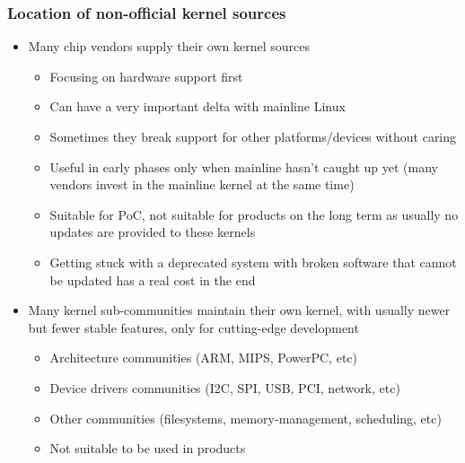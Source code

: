 \begin{frame}
  \frametitle{Location of non-official kernel sources}
  \begin{itemize}
  \item Many chip vendors supply their own kernel sources
    \begin{itemize}
    \item Focusing on hardware support first
    \item Can have a very important delta with mainline Linux
    \item Sometimes they break support for other platforms/devices
      without caring
    \item Useful in early phases only when mainline hasn't caught up yet
      (many vendors invest in the mainline kernel at the same time)
    \item Suitable for PoC, not suitable for products on the long term
      as usually no updates are provided to these kernels
    \item Getting stuck with a deprecated system with broken software
      that cannot be updated has a real cost in the end
    \end{itemize}
  \item Many kernel sub-communities maintain their own kernel, with
    usually newer but fewer stable features, only for cutting-edge
    development
    \begin{itemize}
    \item Architecture communities (ARM, MIPS, PowerPC, etc)
    \item Device drivers communities (I2C, SPI, USB, PCI, network, etc)
    \item Other communities (filesystems, memory-management, scheduling, etc)
    \item Not suitable to be used in products
    \end{itemize}
  \end{itemize}
\end{frame}

